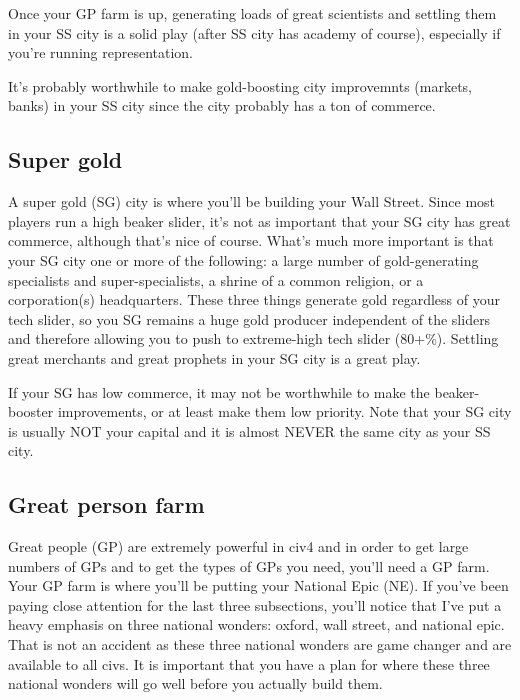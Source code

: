 \documentclass[10pt]{article}
\begin{document}
Once your GP farm is up, generating loads of great scientists and settling
them in your SS city is a solid play (after SS city has academy of course),
especially if you're running representation.

It's probably worthwhile to make gold-boosting city improvemnts (markets, banks)
in your SS city since the city probably has a ton of commerce.

\subsection*{Super gold}

A super gold (SG) city is where you'll be building your Wall
Street. Since most players run a high beaker slider, it's not as
important that your SG city has great commerce, although that's nice
of course. What's much more important is that your SG city one or more
of the following: a large number of gold-generating specialists and
super-specialists, a shrine of a common religion, or a corporation(s)
headquarters. These three things generate gold regardless of your tech
slider, so you SG remains a huge gold producer independent of the
sliders and therefore allowing you to push to extreme-high tech slider
(80+\%). Settling great merchants and great prophets in your SG city
is a great play.

If your SG has low commerce, it may not be worthwhile to make the
beaker-booster improvements, or at least make them low priority. Note
that your SG city is usually NOT your capital and it is almost NEVER
the same city as your SS city.

\subsection*{Great person farm}

Great people (GP) are extremely powerful in civ4 and in order to get
large numbers of GPs and to get the types of GPs you need, you'll need
a GP farm. Your GP farm is where you'll be putting your National Epic
(NE). If you've been paying close attention for the last three
subsections, you'll notice that I've put a heavy emphasis on three
national wonders: oxford, wall street, and national epic. That is not
an accident as these three national wonders are game changer and are
available to all civs. It is important that you have a plan for where
these three national wonders will go well before you actually build
them.
\end{document}
